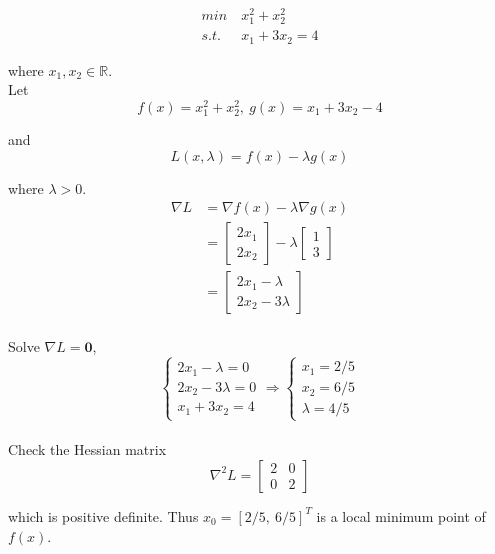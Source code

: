 \documentclass{article}
\newcommand{\RR}{\mathbb{R}}
\begin{document}
\begin{align*}
    min\ & x_1^2+x_2^2\\
    s.t.\ & x_1 + 3x_2 = 4
\end{align*}

where $x_1, x_2 \in \RR$.
\\
Let $$f(x)=x_1^2+x_2^2,\ g(x)=x_1+3 x_2-4$$ 

and $$L(x, \lambda) =  f(x)-\lambda g(x)$$ 

where $\lambda>0$.
\begin{align*}
    \nabla L&=\nabla f(x)-\lambda \nabla g(x)\\
    &=\left[\begin{array}{l}
    2 x_1 \\
    2 x_2
    \end{array}\right]-\lambda\left[\begin{array}{l}
    1 \\
    3
    \end{array}\right]\\
    &=\left[\begin{array}{l}
    2 x_1-\lambda \\
    2 x_2-3 \lambda
    \end{array}\right]
\end{align*}
\\
Solve $\nabla L = \mathbf 0$,
$$
\left\{\begin{array} { l } 
    { 2 x _ { 1 } - \lambda = 0 } \\
    { 2 x _ { 2 } - 3 \lambda = 0 } \\
    { x _ { 1 } + 3 x _ { 2 } = 4 }
    \end{array} \Rightarrow \left\{\begin{array}{l}
    x_1=2/5 \\
    x_2=6/5 \\
    \lambda=4/5
\end{array}\right.\right.
$$
\\
Check the Hessian matrix
$$
\nabla^2L = 
\begin{bmatrix}
    2 & 0\\ 0 & 2
\end{bmatrix}
$$

which is positive definite. Thus $x_0 = [2/5,\ 6/5]^T$ is a local minimum point of $f(x)$.


\section{}
\end{document}
